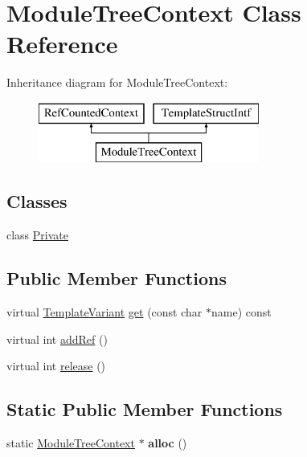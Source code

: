 \hypertarget{class_module_tree_context}{}\section{Module\+Tree\+Context Class Reference}
\label{class_module_tree_context}
Inheritance diagram for Module\+Tree\+Context\+:\begin{figure}[H]
\begin{center}
\leavevmode
\includegraphics[height=2.000000cm]{class_module_tree_context}
\end{center}
\end{figure}
\subsection*{Classes}
\begin{DoxyCompactItemize}
\item 
class \mbox{\hyperlink{class_module_tree_context_1_1_private}{Private}}
\end{DoxyCompactItemize}
\subsection*{Public Member Functions}
\begin{DoxyCompactItemize}
\item 
virtual \mbox{\hyperlink{class_template_variant}{Template\+Variant}} \mbox{\hyperlink{class_module_tree_context_a9a8cd00410c84008a0ecc795de792ce9}{get}} (const char $\ast$name) const
\item 
virtual int \mbox{\hyperlink{class_module_tree_context_a4aa904edd0388660d04d1b96f6b37aed}{add\+Ref}} ()
\item 
virtual int \mbox{\hyperlink{class_module_tree_context_a3e9934215083fbf3ae3cb5c65ecad344}{release}} ()
\end{DoxyCompactItemize}
\subsection*{Static Public Member Functions}
\begin{DoxyCompactItemize}
\item 
\mbox{\label{class_module_tree_context_a2fe6c39e80b2e492444ae8a45c840042}} 
static \mbox{\hyperlink{class_module_tree_context}{Module\+Tree\+Context}} $\ast$ {\bfseries alloc} ()
\end{DoxyCompactItemize}


